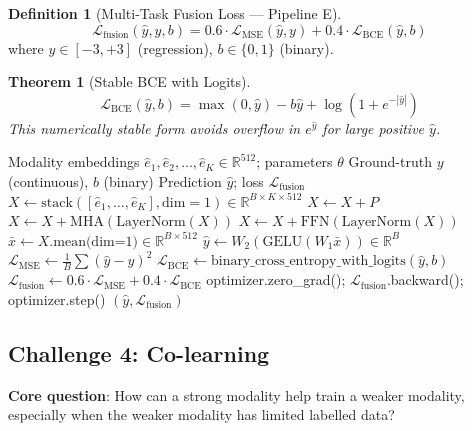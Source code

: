 \documentclass[12pt,a4paper]{article}
\theoremstyle{definition}
\newtheorem{definition}{Definition}[section]
\theoremstyle{plain}
\newtheorem{theorem}{Theorem}[section]
\theoremstyle{remark}
\newcommand{\R}{\mathbb{R}}
\newcommand{\LN}{\mathrm{LayerNorm}}
\newcommand{\GELU}{\mathrm{GELU}}
\newcommand{\MHA}{\mathrm{MHA}}
\begin{document}
\begin{definition}[Multi-Task Fusion Loss --- Pipeline E]
\[
  \mathcal{L}_{\text{fusion}}(\hat{y}, y, b) = 0.6 \cdot \mathcal{L}_{\text{MSE}}(\hat{y}, y) + 0.4 \cdot \mathcal{L}_{\text{BCE}}(\hat{y}, b)
\]
where $y \in [-3,+3]$ (regression), $b \in \{0,1\}$ (binary).
\end{definition}

\begin{theorem}[Stable BCE with Logits]
\[
  \mathcal{L}_{\text{BCE}}(\hat{y}, b) = \max(0, \hat{y}) - b\hat{y} + \log(1 + e^{-|\hat{y}|})
\]
This numerically stable form avoids overflow in $e^{\hat{y}}$ for large positive $\hat{y}$.
\end{theorem}

\begin{algorithm}[H]
\caption{Challenge 3 --- Multimodal Fusion (Cross-Modal Transformer, Pipeline E)}
\label{alg:fusion_challenge}
\begin{algorithmic}[1]
\Require Modality embeddings $\hat{e}_1, \hat{e}_2, \ldots, \hat{e}_K \in \R^{512}$; parameters $\theta$
\Require Ground-truth $y$ (continuous), $b$ (binary)
\Ensure Prediction $\hat{y}$; loss $\mathcal{L}_{\text{fusion}}$
\State $X \gets \text{stack}([\hat{e}_1,\ldots,\hat{e}_K], \text{dim}=1) \in \R^{B \times K \times 512}$
\State $X \gets X + P$ 
  \State $X \gets X + \MHA(\LN(X))$ 
  \State $X \gets X + \text{FFN}(\LN(X))$
\EndFor
\State $\bar{x} \gets X.\text{mean(dim=1)} \in \R^{B \times 512}$
\State $\hat{y} \gets W_2(\GELU(W_1 \bar{x})) \in \R^B$ 
\State $\mathcal{L}_{\text{MSE}} \gets \frac{1}{B}\sum({\hat{y} - y})^2$
\State $\mathcal{L}_{\text{BCE}} \gets \text{binary\_cross\_entropy\_with\_logits}(\hat{y}, b)$
\State $\mathcal{L}_{\text{fusion}} \gets 0.6 \cdot \mathcal{L}_{\text{MSE}} + 0.4 \cdot \mathcal{L}_{\text{BCE}}$
\State optimizer.zero\_grad(); $\mathcal{L}_{\text{fusion}}$.backward(); optimizer.step()
\State \Return $(\hat{y}, \mathcal{L}_{\text{fusion}})$
\end{algorithmic}
\end{algorithm}

\subsection{Challenge 4: Co-learning}

\begin{tcolorbox}[challengebox,title={Challenge 4: Co-learning}]
\textbf{Core question}: How can a strong modality help train a weaker modality, especially when the weaker modality has limited labelled data?
\end{tcolorbox}
\end{document}
